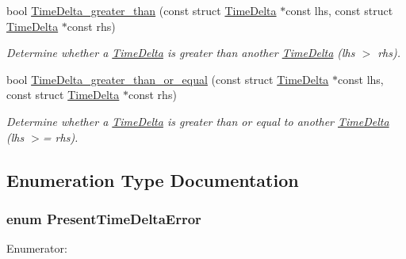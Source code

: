 \begin{DoxyCompactItemize}
bool \hyperlink{time-delta_8h_a80a01f3646dde93f81bad4b2c23fdadb}{\-Time\-Delta\-\_\-greater\-\_\-than} (const struct \hyperlink{structTimeDelta}{\-Time\-Delta} $\ast$const lhs, const struct \hyperlink{structTimeDelta}{\-Time\-Delta} $\ast$const rhs)
\begin{DoxyCompactList}\small\item\em \-Determine whether a \hyperlink{structTimeDelta}{\-Time\-Delta} is greater than another \hyperlink{structTimeDelta}{\-Time\-Delta} (lhs $>$ rhs). \end{DoxyCompactList}\item 
bool \hyperlink{time-delta_8h_acaed23a2a6076ecfcd0540c4865f3bc5}{\-Time\-Delta\-\_\-greater\-\_\-than\-\_\-or\-\_\-equal} (const struct \hyperlink{structTimeDelta}{\-Time\-Delta} $\ast$const lhs, const struct \hyperlink{structTimeDelta}{\-Time\-Delta} $\ast$const rhs)
\begin{DoxyCompactList}\small\item\em \-Determine whether a \hyperlink{structTimeDelta}{\-Time\-Delta} is greater than or equal to another \hyperlink{structTimeDelta}{\-Time\-Delta} (lhs $>$= rhs). \end{DoxyCompactList}\end{DoxyCompactItemize}


\subsection{\-Enumeration \-Type \-Documentation}
\hypertarget{time-delta_8h_a6090105e9137c36754994cda35937b59}{
\subsubsection[{\-Present\-Time\-Delta\-Error}]{\setlength{\rightskip}{0pt plus 5cm}enum {\bf \-Present\-Time\-Delta\-Error}}}\label{time-delta_8h_a6090105e9137c36754994cda35937b59}
\begin{Desc}
\item[\-Enumerator\-: ]\par
\begin{description}
\item[{\em 
\hypertarget{time-delta_8h_a6090105e9137c36754994cda35937b59a61286fb07f463a3add14112870d9f834}{\-Time\-Delta\-\_\-\-E\-R\-R\-O\-R\-\_\-\-N\-O\-N\-E}\label{time-delta_8h_a6090105e9137c36754994cda35937b59a61286fb07f463a3add14112870d9f834}
}]\end{description}
\end{Desc}



